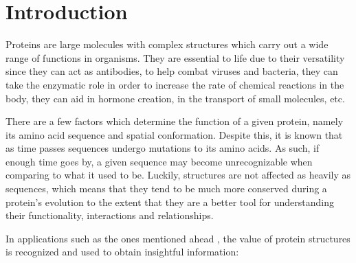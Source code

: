 \newcommand{\novathesis}{\emph{novathesis}}
\newcommand{\novathesisclass}{\texttt{novathesis.cls}}

\chapter{Introduction}

Proteins are large molecules with complex structures which carry out a wide range of functions in organisms. They are essential to life due to their versatility since they can act as antibodies, to help combat viruses and bacteria, they can take the enzymatic role in order to increase the rate of chemical reactions in the body, they can aid in hormone creation, in the transport of small molecules, etc.

There are a few factors which determine the function of a given protein, namely its amino acid sequence and spatial conformation. Despite this, it is known that as time passes sequences undergo mutations to its amino acids. As such, if enough time goes by, a given sequence may become unrecognizable when comparing to what it used to be. Luckily, structures are not affected as heavily as sequences, which means that they tend to be much more conserved during a protein's evolution to the extent that they are a better tool for understanding their functionality, interactions and relationships.

In applications such as the ones mentioned ahead \cite{kufareva2011methods}, the value of protein structures is recognized and used to obtain insightful information:

